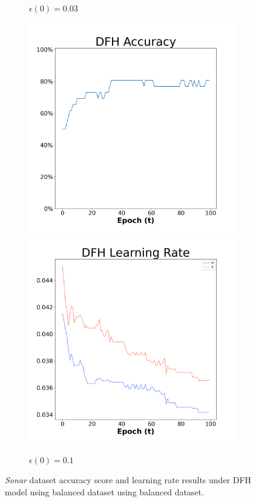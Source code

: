 \begin{figure}[H]
\begin{subfigure}{0.3\textwidth}
  \caption{$\epsilon(0)=0.03$}
\end{subfigure}\hfil %
\begin{subfigure}{0.3\textwidth}
  \includegraphics[width=\linewidth]{images/exper1/Sonar/DFH_0.1_acc.png}
  \includegraphics[width=\linewidth]{images/exper1/Sonar/DFH_0.1_lr.png}
  \caption{$\epsilon(0)=0.1$}
\end{subfigure}

\caption{\textit{Sonar} dataset accuracy score and learning rate results under DFH model using balanced dataset using balanced dataset.}
\end{figure}

